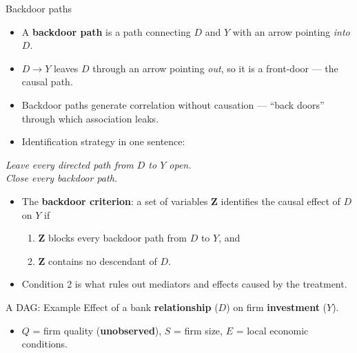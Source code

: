 \documentclass[
  11pt,
  ignorenonframetext,
  aspectratio=169,
]{beamer}
\providecommand{\tightlist}{%
  \setlength{\itemsep}{0pt}\setlength{\parskip}{0pt}}
\begin{document}
\begin{frame}{Backdoor paths}
\protect{}\label{backdoor-paths}
\begin{itemize}
\tightlist
\item
  A \textbf{backdoor path} is a path connecting \(D\) and \(Y\) with an
  arrow pointing \emph{into} \(D\).
\item
  \(D \to Y\) leaves \(D\) through an arrow pointing \emph{out}, so it
  is a front-door --- the causal path.
\item
  Backdoor paths generate correlation without causation --- ``back
  doors'' through which association leaks.
\item
  Identification strategy in one sentence:
\end{itemize}

\begin{center}
\emph{Leave every directed path from $D$ to $Y$ open.\\
Close every backdoor path.}
\end{center}

\begin{itemize}
\tightlist
\item
  The \textbf{backdoor criterion}: a set of variables \(\mathbf{Z}\)
  identifies the causal effect of \(D\) on \(Y\) if

  \begin{enumerate}
  \tightlist
  \item
    \(\mathbf{Z}\) blocks every backdoor path from \(D\) to \(Y\), and
  \item
    \(\mathbf{Z}\) contains no descendant of \(D\).
  \end{enumerate}
\item
  Condition 2 is what rules out mediators and effects caused by the
  treatment.
\end{itemize}
\end{frame}

\begin{frame}{A DAG: Example}
\protect{}\label{a-dag-example}
Effect of a bank \textbf{relationship} (\(D\)) on firm
\textbf{investment} (\(Y\)).

\begin{center}
\end{center}

\vspace{-0.3em}

\begin{itemize}
\tightlist
\item
  \(Q\) = firm quality (\textbf{unobserved}), \(S\) = firm size, \(E\) =
  local economic conditions.
\end{itemize}
\end{frame}
\end{document}

